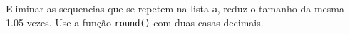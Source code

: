 \documentclass[12pt,varwidth=16cm,border=1pt]{standalone}
\begin{document}
Eliminar as sequencias que se repetem na lista \verb+a+, reduz o tamanho da mesma 1.05 vezes. Use a função \verb+round()+ com duas casas decimais.

\questiomfalse
\end{document}
